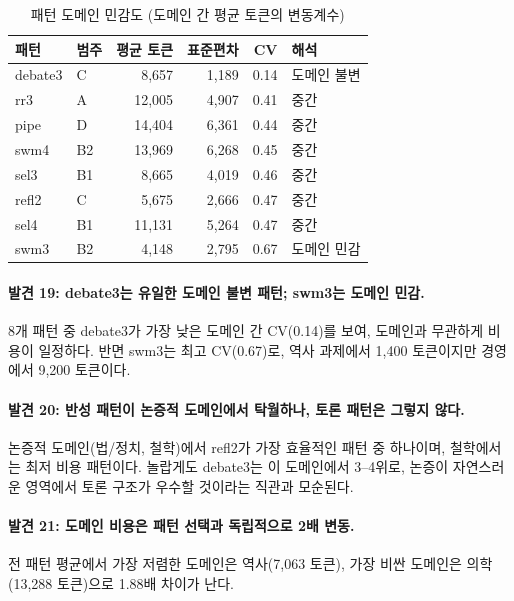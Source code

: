 \documentclass[a4paper,11pt]{article}
\begin{document}
\begin{table}[H]
\centering
\caption{패턴 도메인 민감도 (도메인 간 평균 토큰의 변동계수)}
\label{tab:domain-cv}
{\small
\begin{tabular}{llrrrl}
\toprule
패턴 & 범주 & 평균 토큰 & 표준편차 & CV & 해석 \\
\midrule
debate3 & C  & 8,657  & 1,189 & 0.14 & 도메인 불변 \\
rr3     & A  & 12,005 & 4,907 & 0.41 & 중간 \\
pipe    & D  & 14,404 & 6,361 & 0.44 & 중간 \\
swm4    & B2 & 13,969 & 6,268 & 0.45 & 중간 \\
sel3    & B1 & 8,665  & 4,019 & 0.46 & 중간 \\
refl2   & C  & 5,675  & 2,666 & 0.47 & 중간 \\
sel4    & B1 & 11,131 & 5,264 & 0.47 & 중간 \\
swm3    & B2 & 4,148  & 2,795 & 0.67 & 도메인 민감 \\
\bottomrule
\end{tabular}
}
\end{table}

\paragraph{발견 19: debate3는 유일한 도메인 불변 패턴; swm3는 도메인 민감.}
8개 패턴 중 debate3가 가장 낮은 도메인 간 CV(0.14)를 보여, 도메인과 무관하게 비용이 일정하다. 반면 swm3는 최고 CV(0.67)로, 역사 과제에서 1,400 토큰이지만 경영에서 9,200 토큰이다.

\paragraph{발견 20: 반성 패턴이 논증적 도메인에서 탁월하나, 토론 패턴은 그렇지 않다.}
논증적 도메인(법/정치, 철학)에서 refl2가 가장 효율적인 패턴 중 하나이며, 철학에서는 최저 비용 패턴이다. 놀랍게도 debate3는 이 도메인에서 3--4위로, 논증이 자연스러운 영역에서 토론 구조가 우수할 것이라는 직관과 모순된다.

\paragraph{발견 21: 도메인 비용은 패턴 선택과 독립적으로 2배 변동.}
전 패턴 평균에서 가장 저렴한 도메인은 역사(7,063 토큰), 가장 비싼 도메인은 의학(13,288 토큰)으로 1.88배 차이가 난다.

\end{document}
